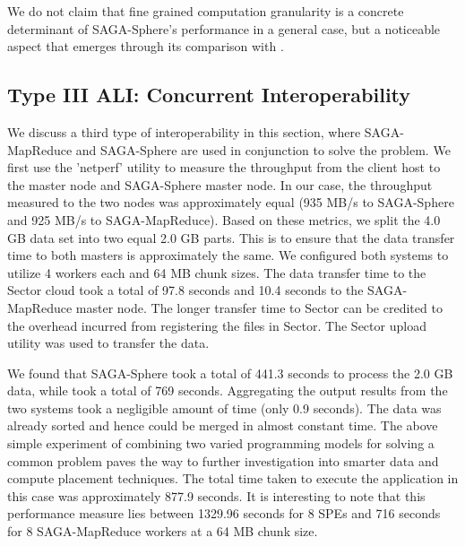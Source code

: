 \documentclass[3p,twocolumn]{elsarticle}
\begin{document}

We do not claim that fine grained computation granularity is a concrete
determinant of SAGA-Sphere's performance in a general case, but a
noticeable aspect that emerges through its comparison with
\sagamapreduce.


\subsection{Type III ALI: Concurrent Interoperability}

We discuss a third type of interoperability in this section, where
SAGA-MapReduce and SAGA-Sphere are used in conjunction to solve the
\wc problem. We first use the 'netperf' utility to measure the
throughput from the client host to the \sagamapreduce master node and
SAGA-Sphere master node.  In our case, the throughput measured to the
two nodes was approximately equal (935 MB/s to SAGA-Sphere and 925
MB/s to SAGA-MapReduce).  Based on these metrics, we split the 4.0 GB
data set into two equal 2.0 GB parts. This is to ensure that the data
transfer time to both masters is approximately the same. We configured
both systems to utilize 4 workers each and 64 MB chunk sizes. The data
transfer time to the Sector cloud took a total of 97.8 seconds and
10.4 seconds to the SAGA-MapReduce master node. The longer transfer
time to Sector can be credited to the overhead incurred from
registering the files in Sector. The Sector upload utility was used 
to transfer the data. 
  

We found that SAGA-Sphere took a total of 441.3 seconds to process the
2.0 GB data, while \sagamapreduce took a total of 769
seconds. Aggregating the output results from the two systems took a
negligible amount of time (only 0.9 seconds). The data was already
sorted and hence could be merged in almost constant
time. %
The above simple experiment of combining two varied programming models
for solving a common problem paves the way to further investigation
into smarter data and compute placement techniques.  The total time
taken to execute the \wc application in this case was approximately
877.9 seconds. It is interesting to note that this performance measure
lies between 1329.96 seconds for 8 SPEs and 716 seconds for 8
SAGA-MapReduce workers at a 64 MB chunk size.
\end{document}

